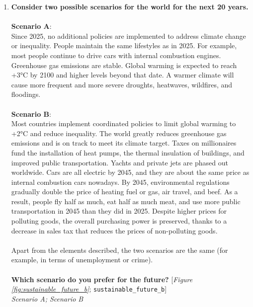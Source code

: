 \begin{enumerate}[resume]
\item  \label{q:sustainable_future_b} \textbf{Consider two possible scenarios for the world for the next 20 years.\~\\\\Scenario A}:\\Since 2025, no additional policies are implemented to address climate change or inequality. People maintain the same lifestyles as in 2025. For example, most people continue to drive cars with internal combustion engines. Greenhouse gas emissions are stable. Global warming is expected to reach +3°C by 2100 and higher levels beyond that date. A warmer climate will cause more frequent and more severe droughts, heatwaves, wildfires, and floodings.\\\\\textbf{Scenario B}: \\Most countries implement coordinated policies to limit global warming to +2°C and reduce inequality. The world greatly reduces greenhouse gas emissions and is on track to meet its climate target. Taxes on millionaires fund the installation of heat pumps, the thermal insulation of buildings, and improved public transportation. Yachts and private jets are phased out worldwide. Cars are all electric by 2045, and they are about the same price as internal combustion cars nowadays. By 2045, environmental regulations gradually double the price of heating fuel or gas, air travel, and beef. As a result, people fly half as much, eat half as much meat, and use more public transportation in 2045 than they did in 2025. Despite higher prices for polluting goods, the overall purchasing power is preserved, thanks to a decrease in sales tax that reduces the prices of non-polluting goods.\\\\Apart from the elements described, the two scenarios are the same (for example, in terms of unemployment or crime). \\\\\textbf{Which scenario do you prefer for the future?} [\textit{Figure \ref{fig:sustainable_future_b}}; 
\verb|sustainable_future_b|]
  \\ \textit{Scenario A; Scenario B}


\end{enumerate}

